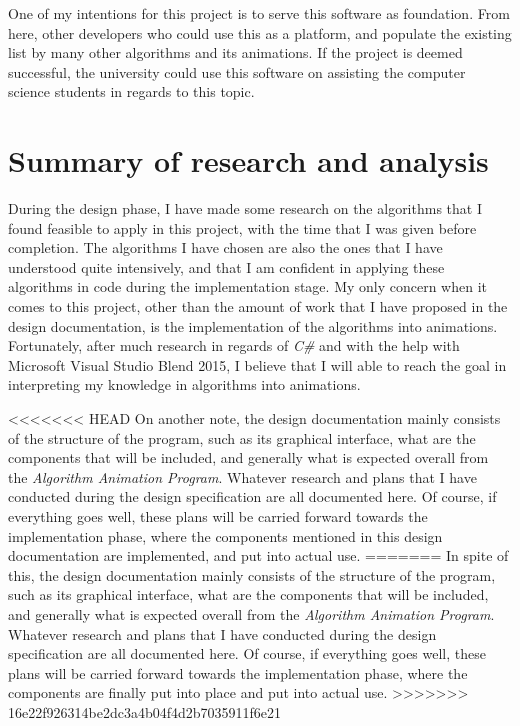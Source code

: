 One of my intentions for this project is to serve this software as foundation. From here, other developers who could use this as a platform, and populate the existing list by many other algorithms and its animations. If the project is deemed successful, the university could use this software on assisting the computer science students in regards to this topic. 


\section{Summary of research and analysis}

During the design phase, I have made some research on the algorithms that I found feasible to apply in this project, with the time that I was given before completion. The algorithms I have chosen are also the ones that I have understood quite intensively, and that I am confident in applying these algorithms in code during the implementation stage. My only concern when it comes to this project, other than the amount of work that I have proposed in the design documentation, is the implementation of the algorithms into animations. Fortunately, after much research in regards of \textit{C\#} and with the help with Microsoft Visual Studio Blend 2015, I believe that I will able to reach the goal in interpreting my knowledge in algorithms into animations.

<<<<<<< HEAD
On another note, the design documentation mainly consists of the structure of the program, such as its graphical interface, what are the components that will be included, and generally what is expected overall from the \textit{Algorithm Animation Program}. Whatever research and plans that I have conducted during the design specification are all documented here. Of course, if everything goes well, these plans will be carried forward towards the implementation phase, where the components mentioned in this design documentation are implemented, and put into actual use. 
=======
In spite of this, the design documentation mainly consists of the structure of the program, such as its graphical interface, what are the components that will be included, and generally what is expected overall from the \textit{Algorithm Animation Program}. Whatever research and plans that I have conducted during the design specification are all documented here. Of course, if everything goes well, these plans will be carried forward towards the implementation phase, where the components are finally put into place and put into actual use. 
>>>>>>> 16e22f926314be2dc3a4b04f4d2b7035911f6e21
